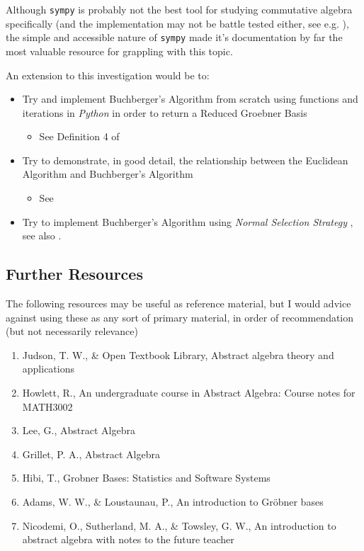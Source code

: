 \documentclass[a4paper,11pt,twoside]{article}
\begin{document}
Although \texttt{sympy} is probably not the best tool for studying
commutative algebra specifically (and the implementation may not be
battle tested either, see e.g. \cite{WrongGroebnerBasis}), the simple
and accessible nature of \texttt{sympy} made it's documentation by far the
most valuable resource for grappling with this topic.

An extension to this investigation would be to:

\begin{itemize}
\item Try and implement Buchberger's Algorithm from scratch using
functions and iterations in \emph{Python} in order to return a Reduced
Groebner Basis
\begin{itemize}
\item See Definition 4 of \cite[\S 7]{coxIdealsVarietiesAlgorithms1997}
\end{itemize}
\item Try to demonstrate, in good detail, the relationship between
the Euclidean Algorithm and Buchberger's Algorithm
\begin{itemize}
\item See \cite[p. 95]{coxIdealsVarietiesAlgorithms1997}
\end{itemize}
\item Try to implement Buchberger's Algorithm using \emph{Normal Selection
Strategy} \cite[\S 3.1.2]{hibiGrobnerBasesStatistics2014}, see also \cite{sympydevelopmentteamSympyPolysGroebnertools,prof.berndsturmfelsIntroductionGrobnerBases2017}.
\end{itemize}

\subsection{Further Resources}
\label{sec:org91084bd}
The following resources may be useful as reference material, but I
would advice against using these as any sort of primary material,
in order of recommendation (but not necessarily relevance)



\begin{enumerate}
\item Judson, T. W., \& Open Textbook Library, Abstract algebra
theory and applications \cite{judsonAbstractAlgebraTheory2016}
\item Howlett, R., An undergraduate course in Abstract Algebra:
Course notes for MATH3002 \cite{roberthowlettUndergraduateCourseAbstract}
\item Lee, G., Abstract Algebra \cite{gregoryleeAbstractAlgebra2018}
\item Grillet, P. A., Abstract Algebra \cite{grilletAbstractAlgebra2007}
\item Hibi, T., Grobner Bases: Statistics and Software Systems \cite{hibiGrobnerBasesStatistics2014}
\item Adams, W. W., \& Loustaunau, P., An introduction to Gröbner bases \cite{adamsIntroductionGrobnerBases1994}
\item Nicodemi, O., Sutherland, M. A., \& Towsley, G. W., An
introduction to abstract algebra with notes to the future
teacher \cite{nicodemiIntroductionAbstractAlgebra2007a}
\end{enumerate}
\end{document}
